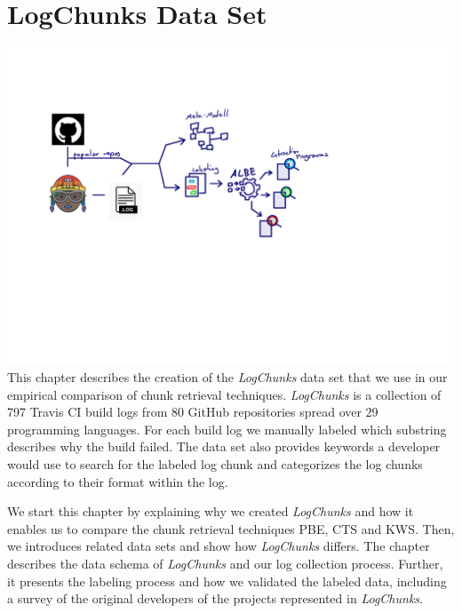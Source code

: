 \documentclass[\myrootdir/main.tex]{subfiles}
\begin{document}
\chapter{LogChunks Data Set}
\label{sec:data-set}
\includegraphics[page=5, width=\textwidth, trim={0.5cm 0.5cm 0.5cm 0.5cm}, clip]{img/flow-of-research.pdf}
This chapter describes the creation of the \emph{LogChunks} data set that we use in our empirical comparison of chunk retrieval techniques.
\emph{LogChunks} is a collection of 797 Travis CI build logs from 80 GitHub repositories spread over 29 programming languages.
For each build log we manually labeled which substring describes why the build failed.
The data set also provides keywords a developer would use to search for the labeled log chunk and categorizes the log chunks according to their format within the log.

We start this chapter by explaining why we created \emph{LogChunks} and how it enables us to compare the chunk retrieval techniques PBE, CTS and KWS\@.
Then, we introduces related data sets and show how \emph{LogChunks} differs.
The chapter describes the data schema of \emph{LogChunks} and our log collection process.
Further, it presents the labeling process and how we validated the labeled data, including a survey of the original developers of the projects represented in \emph{LogChunks}.
\end{document}
